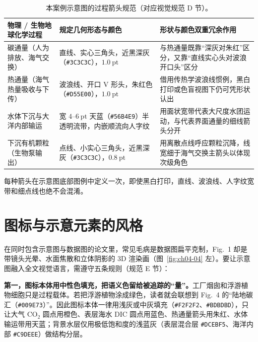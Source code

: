 \begin{table}[htbp]\centering\footnotesize
\setlength{\tabcolsep}{4pt}
\renewcommand{\arraystretch}{1.15}
\caption{本案例示意图的过程箭头规范（对应视觉规范 D 节）。}\label{tab:ch04-arrows}
\begin{tabularx}{\linewidth}{@{}>{\raggedright\arraybackslash}p{36mm}Y>{\raggedright\arraybackslash}p{44mm}@{}}
\toprule
\textbf{物理 / 生物地球化学过程} & \textbf{规定几何形态与颜色} & \textbf{形状与颜色双重冗余作用} \\
\midrule
碳通量（人为排放、海气交换） & 直线、实心三角头，近黑深灰（\texttt{\#3C3C3C}），$1.0\ \text{pt}$ & 与热通量既靠“深灰对朱红”区分，又靠“直线实心头对波浪开口头”区分 \\
热通量（海气热量吸收与下传） & 波浪线、开口 V 形头，朱红色（\texttt{\#D55E00}），$1.0\ \text{pt}$ & 借用传热学波浪线惯例，黑白打印或色盲视图下仍可凭形状认出 \\
水体下沉与大洋内部输运 & 宽 $4\text{--}6\ \text{pt}$ 天蓝（\texttt{\#56B4E9}）半透明流带，内嵌顺流向人字纹 & 用面状宽带代表大尺度水团运动，与代表界面通量的细线箭头分开 \\
下沉有机颗粒（生物泵输出） & 点线、小实心三角头，近黑深灰（\texttt{\#3C3C3C}），$0.8\ \text{pt}$ & 用离散点线呼应颗粒沉降，线宽细于海气交换主箭头以体现次级角色 \\
\bottomrule
\end{tabularx}
\end{table}

每种箭头在示意图底部图例中定义一次，即使黑白打印，直线、波浪线、人字纹宽带和细点线也绝不会混淆。

\section{图标与示意元素的风格}

在同时包含示意图与数据图的论文里，常见毛病是数据图扁平克制，Fig.\ 1 却是带镜头光晕、水面焦散和立体阴影的 3D 渲染画（图~\ref{fig:ch04-04} 左）。要让示意图融入全文视觉语言，需遵守五条规则（规范 E 节）：

\textbf{第一，图标本体用中性色填充，把语义色留给被追踪的“量”。}工厂烟囱和浮游植物细胞只是过程载体。若把浮游植物涂成绿色，读者就会联想到 Fig.\ 4 的“陆地碳汇（\texttt{\#009E73}）”。因此图标本体一律用浅灰或中灰填充（\texttt{\#F2F2F2}、\texttt{\#BDBDBD}），只让大气 $\text{CO}_2$ 圆点用橙色、表层海水 DIC 圆点用蓝色、热通量箭头用朱红、水体输运带用天蓝；背景水层仅用极低饱和度的浅蓝灰（表层混合层 \texttt{\#DCEBF5}、海洋内部 \texttt{\#C9DEEE}）做结构分层。

